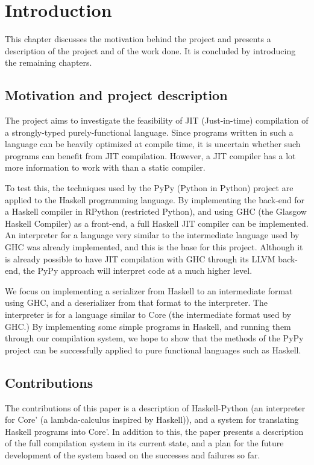 
\chapter{Introduction}

This chapter discusses the motivation behind the project and 
presents a description of the project and of the work done. It 
is concluded by introducing the remaining chapters.

\section{Motivation and project description}

The project aims to investigate the feasibility of JIT (Just-in-time) 
compilation of a strongly-typed purely-functional language. Since
programs written in such a language can be heavily optimized at 
compile time, it is uncertain whether such programs can benefit from
JIT compilation. However, a JIT compiler has a lot more information to
work with than a static compiler. 

To test this, the techniques 
used by the PyPy (Python in Python) project are applied to the Haskell 
programming language. By implementing the back-end for a Haskell compiler 
in RPython (restricted Python), and using GHC (the Glasgow Haskell Compiler) 
as a front-end, a full Haskell JIT compiler can be implemented. An 
interpreter for a language very similar to the intermediate language used
by GHC was already implemented, and this is the base for this project.
Although it is already possible to have JIT compilation with GHC through
its LLVM back-end, the PyPy approach will interpret code at a much higher level.

We focus on implementing a serializer from Haskell to an intermediate
format using GHC, and a deserializer from that format to the interpreter. The 
interpreter is for a language similar to Core (the intermediate format used by GHC.)
By implementing some simple programs in Haskell, and running them through our 
compilation system, 
we hope to show that the methods of the PyPy project can be successfully applied 
to pure functional languages such as Haskell.

\section{Contributions}
The contributions of this paper is a description of Haskell-Python (an
interpreter for Core' (a lambda-calculus inspired by Haskell)), and a system for
translating Haskell programs into Core'. In addition to this, the paper 
presents a description of the full compilation system in its current state,
and a plan for the future development of the system based on the 
successes and failures so far.

